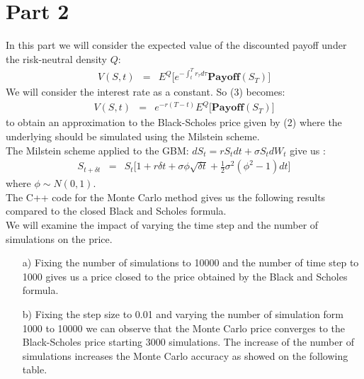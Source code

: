 \documentclass[11pt,oneside,a4paper, titlepage]{article}
\begin{document}
\newpage
\section*{Part 2}
In this part we will consider the expected value of the discounted payoff under the risk-neutral density \(Q\):
\begin{eqnarray}
V(S, t)&=&E^{Q}\Bigg[ e^{-\int_{t}^{T}r_\tau d\tau}\textbf{Payoff}(S_T)\Bigg]
\end{eqnarray}
We will consider the interest rate as a constant. So (3) becomes:
\begin{eqnarray}
V(S, t)&=&e^{-r(T-t)}E^{Q}\Bigg[\textbf{Payoff}(S_T)\Bigg]
\end{eqnarray}
to obtain an approximation to the Black-Scholes price given by (2) where the underlying should be simulated using the Milstein scheme.\\ 
The Milstein scheme applied to the GBM: 
\(dS_t=rS_tdt+\sigma S_t dW_t\) give us :
\begin{eqnarray*}
S_{t+\delta t}&=&S_t\Big[ 1+r\delta t+\sigma\phi\sqrt{\delta t}+\frac{1}{2}\sigma^2(\phi^2-1)dt\Big]
\end{eqnarray*}
where \(\phi \sim N(0,1)\).\\
The C++ code for the Monte Carlo method gives us the following results compared to the closed Black and Scholes formula.\\ We will examine the impact of varying the time step and the number of simulations on the price.\\

\begin{enumerate}
\item [a)] Fixing the number of simulations to 10000 and the number of time step to 1000 gives us a price closed to the price obtained by the Black and Scholes formula.
\item [b)] Fixing the step size to 0.01 and varying the number of simulation form 1000 to 10000 we can observe that the Monte Carlo price converges to the Black-Scholes price starting 3000 simulations. The increase of the number of simulations increases the Monte Carlo accuracy as showed on the following table.
\end{enumerate}
\vskip 0.2cm 
\end{document}
